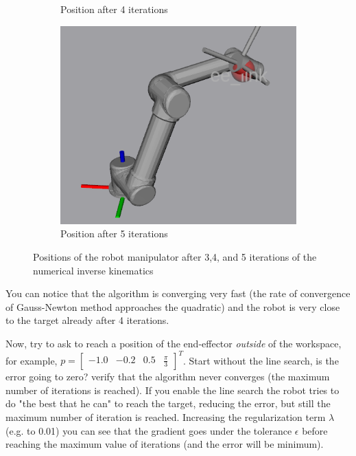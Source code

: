 \documentclass[11pt]{article}
\newcommand{\mat}[1]{\ensuremath{\begin{bmatrix}#1\end{bmatrix}}}	%
\begin{document}
\begin{figure}[H]
\begin{subfigure}[b]{0.3\textwidth}
		\caption{Position after 4 iterations}
		\label{fig:4it}
	\end{subfigure}
	\begin{subfigure}[b]{0.3\textwidth}
		\centering
		\includegraphics[height=\textwidth]{pics/5iters.png}
		\caption{Position after 5 iterations}
		\label{fig:5it}			
	\end{subfigure}
	\caption{Positions of the robot manipulator after 3,4, and 5 iterations of the numerical inverse kinematics}
	\label{fig:ik}
\end{figure} 
 
You can notice that the algorithm is converging very fast (the rate of convergence of Gauss-Newton method approaches the quadratic) and the robot is very close to  the target already after 4 iterations. 
 
Now, try to ask to reach a position of the end-effector \textit{outside} of the workspace, for example, $p = \mat{	-1.0 & -0.2 & 0.5 & \frac{\pi}{3}}^T$. Start without the line search, is the error going to zero? verify that the algorithm never converges (the maximum number of iterations is reached). If you enable the line search the robot tries to do "the best that he can" to reach the target, reducing the error, but still the maximum number of iteration is reached. Increasing the regularization term $\lambda$ (e.g. to 0.01) you can see that the gradient goes under the tolerance $\epsilon$ before reaching the maximum value of iterations (and the error will be minimum).
\end{document}
